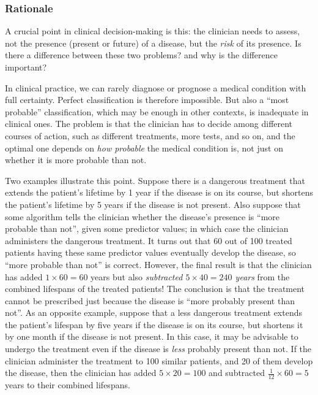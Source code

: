 \documentclass[utf8]{FrontiersinHarvard_mod} %
\renewcommand*{\|}[1][]{\nonscript\:#1\vert\nonscript\:\mathopen{}}
\begin{document}
\subsubsection{Rationale}
\label{sec:expected_utility_theory}


A crucial point in clinical decision-making is this: the clinician needs to assess, not the presence (present or future) of a disease, but the \emph{risk} of its presence. Is there a difference between these two problems? and why is the difference important?

In clinical practice, we can rarely diagnose or prognose a medical condition with full certainty. Perfect classification is therefore impossible. But also a \enquote{most probable} classification, which may be enough in other contexts, is inadequate in clinical ones. The problem is that the clinician has to decide among different courses of action, such as different treatments, more tests, and so on, and the optimal one depends on \emph{how probable} the medical condition is, not just on whether it is more probable than not.

Two examples illustrate this point. Suppose there is a dangerous treatment that extends the patient's lifetime by 1 year if the disease is on its course, but shortens the patient's lifetime by 5 years if the disease is not present. Also suppose that some algorithm tells the clinician whether the disease's presence is \enquote{more probable than not}, given some predictor values; in which case the clinician administers the dangerous treatment. It turns out that 60 out of 100 treated patients having these same predictor values eventually develop the disease, so \enquote{more probable than not} is correct. However, the final result is that the clinician has added $1 \times 60 = 60$ years but also \emph{subtracted $\mathit{5 \times 40 = 240}$ years} from the combined lifespans of the treated patients! The conclusion is that the treatment cannot be prescribed just because the disease is \enquote{more probably present than not}. As an opposite example, suppose that a less dangerous treatment extends the patient's lifespan by five years if the disease is on its course, but shortens it by one month if the disease is not present. In this case, it may be advisable to undergo the treatment even if the disease is \emph{less} probably present than not. If the clinician administer the treatment to 100 similar patients, and 20 of them develop the disease, then the clinician has added $5 \times 20=100$ and subtracted $\tfrac{1}{12} \times 60=5$ years to their combined lifespans.
\end{document}
